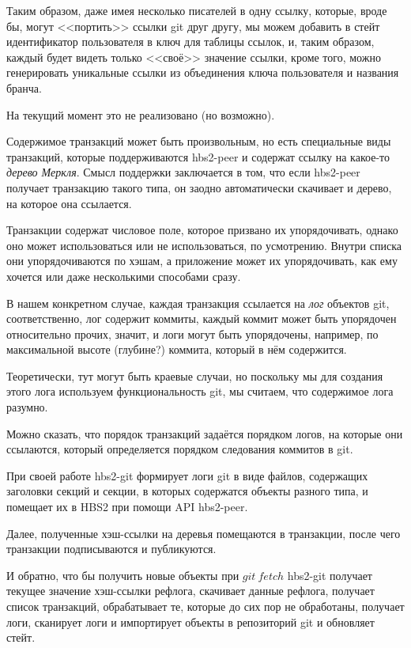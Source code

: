 \documentclass[11pt,a4paper]{article}
\newcommand{\term}[2]{\textit{#2}}
\begin{document}
Таким образом, даже имея несколько писателей в одну ссылку, которые, вроде бы, могут <<портить>>
ссылки git друг другу, мы можем добавить в стейт идентификатор пользователя в ключ для таблицы
ссылок, и, таким образом, каждый будет видеть только <<своё>> значение ссылки, кроме того, можно
генерировать уникальные ссылки из объединения ключа пользователя и названия бранча.

На текущий момент это не реализовано (но возможно).

Содержимое транзакций может быть произвольным, но есть специальные виды транзакций,
которые поддерживаются hbs2-peer и содержат ссылку на какое-то \term{ann-merkle-tree}{дерево
Меркля}. Смысл поддержки заключается в том, что если hbs2-peer получает транзакцию такого
типа, он заодно автоматически скачивает и дерево, на которое она ссылается.

Транзакции содержат числовое поле, которое призвано их упорядочивать, однако оно может
использоваться или не использоваться, по усмотрению. Внутри списка они упорядочиваются по хэшам, а
приложение может их упорядочивать, как ему хочется или даже несколькими способами сразу.

В нашем конкретном случае, каждая транзакция ссылается на \term{log}{лог} объектов git,
соответственно, лог содержит коммиты, каждый коммит может быть упорядочен относительно прочих,
значит, и логи могут быть упорядочены, например, по максимальной высоте (глубине?) коммита,
который в нём содержится.

Теоретически, тут могут быть краевые случаи, но поскольку мы для создания этого лога
используем функциональность git, мы считаем, что содержимое лога разумно.

Можно сказать, что порядок транзакций задаётся порядком логов, на которые они ссылаются,
который определяется порядком следования коммитов в git.

При своей работе hbs2-git формирует логи git в виде файлов, содержащих заголовки секций
и секции, в которых содержатся объекты разного типа, и помещает их в HBS2 при помощи API hbs2-peer.

Далее, полученные хэш-ссылки на деревья помещаются в транзакции, после чего транзакции подписываются
и публикуются.

И обратно, что бы получить новые объекты при $git~fetch$  hbs2-git получает текущее значение
хэш-ссылки рефлога, скачивает данные рефлога, получает список транзакций, обрабатывает те, которые
до сих пор не обработаны, получает логи, сканирует логи и импортирует объекты в репозиторий git
и обновляет стейт.
\end{document}
